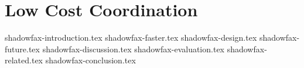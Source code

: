 \chapter{Low Cost Coordination}

 {shadowfax-introduction.tex}
 {shadowfax-faster.tex}
 {shadowfax-design.tex}
 {shadowfax-future.tex}
 {shadowfax-discussion.tex}
 {shadowfax-evaluation.tex}
 {shadowfax-related.tex}
 {shadowfax-conclusion.tex}
